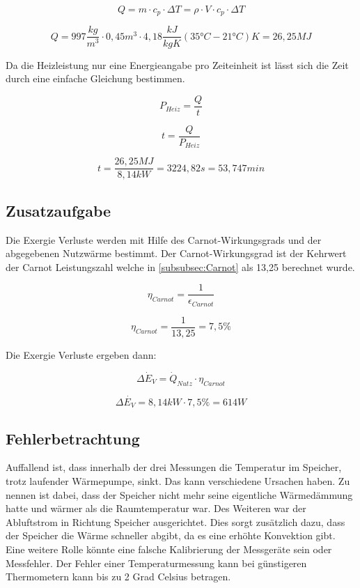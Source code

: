 \begin{equation}
Q = m \cdot c_p \cdot \Delta T = \rho \cdot V \cdot c_p \cdot \Delta T
\end{equation}

$$ Q = 997 \frac{kg}{m^3} \cdot 0,45 m^3 \cdot 4,18 \frac{kJ}{kg K} (35 \text{°} C-21 \text{°} C)K=26,25 MJ$$

Da die Heizleistung nur eine Energieangabe pro Zeiteinheit ist lässt sich die Zeit durch eine einfache Gleichung bestimmen.

\begin{equation}
    P_{Heiz}= \frac{Q}{t}
\end{equation}

\begin{equation}
 t = \frac{Q}{P_{Heiz}}
\end{equation}

$$ t= \frac{26,25 MJ}{8,14 kW}=3224,82 s= 53,747 min$$

\subsection{Zusatzaufgabe}

Die Exergie Verluste werden mit Hilfe des Carnot-Wirkungsgrads und der abgegebenen Nutzwärme bestimmt.
Der Carnot-Wirkungsgrad ist der Kehrwert der Carnot Leistungszahl welche in \autoref{subsubsec:Carnot} als 13,25 berechnet wurde.

\begin{equation}
    \eta_{Carnot}=\frac{1}{\epsilon_{Carnot}}
\end{equation}

$$\eta_{Carnot}=\frac{1}{13,25}= 7,5 \%$$

Die Exergie Verluste ergeben dann:

\begin{equation}
   \Delta \dot{E}_V= \dot{Q}_{Nutz} \cdot\eta_{Carnot}
\end{equation}

$$\Delta \dot{E_V}= 8,14kW \cdot 7,5\%= 614W$$


\subsection{Fehlerbetrachtung}
Auffallend ist, dass innerhalb der drei Messungen die Temperatur im Speicher,
trotz laufender Wärmepumpe, sinkt. Das kann verschiedene Ursachen haben. Zu nennen ist dabei, dass der Speicher nicht mehr seine eigentliche Wärmedämmung hatte und wärmer als die Raumtemperatur war. Des Weiteren war der Abluftstrom in Richtung Speicher ausgerichtet. Dies sorgt zusätzlich dazu, dass der Speicher die Wärme schneller abgibt, da es eine erhöhte Konvektion gibt.
Eine weitere Rolle könnte eine falsche Kalibrierung der Messgeräte sein oder Messfehler. Der Fehler einer Temperaturmessung kann bei günstigeren Thermometern kann bis zu 2 Grad Celsius betragen.

